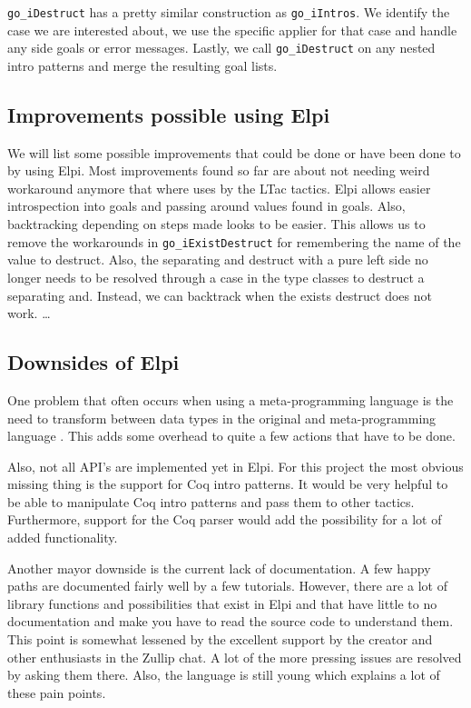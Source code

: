 \documentclass[thesis.tex]{subfiles}
\begin{document}
\texttt{go_iDestruct} has a pretty similar construction as \texttt{go_iIntros}. We identify the case we are interested about, we use the specific applier for that case and handle any side goals or error messages. Lastly, we call \texttt{go_iDestruct} on any nested intro patterns and merge the resulting goal lists.

\subsection*{Improvements possible using Elpi}
We will list some possible improvements that could be done or have been done to by using Elpi. Most improvements found so far are about not needing weird workaround anymore that where uses by the LTac tactics. Elpi allows easier introspection into goals and passing around values found in goals. Also, backtracking depending on steps made looks to be easier. This allows us to remove the workarounds in \texttt{go_iExistDestruct} for remembering the name of the value to destruct. Also, the separating and destruct with a pure left side no longer needs to be resolved through a case in the type classes to destruct a separating and. Instead, we can backtrack when the exists destruct does not work.
\dots

\subsection*{Downsides of Elpi}
One problem that often occurs when using a meta-programming language is the need to transform between data types in the original and meta-programming language \cite*{}. This adds some overhead to quite a few actions that have to be done.

Also, not all API's are implemented yet in Elpi. For this project the most obvious missing thing is the support for Coq intro patterns. It would be very helpful to be able to manipulate Coq intro patterns and pass them to other tactics. Furthermore, support for the Coq parser would add the possibility for a lot of added functionality.

Another mayor downside is the current lack of documentation. A few happy paths are documented fairly well by a few tutorials. However, there are a lot of library functions and possibilities that exist in Elpi and \ce that have little to no documentation and make you have to read the source code to understand them. This point is somewhat lessened by the excellent support by the creator and other enthusiasts in the Zullip chat. A lot of the more pressing issues are resolved by asking them there. Also, the language is still young which explains a lot of these pain points.
\end{document}
